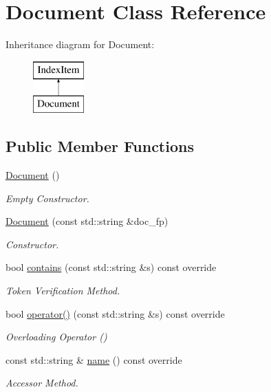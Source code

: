 \hypertarget{class_document}{}\section{Document Class Reference}
\label{class_document}
Inheritance diagram for Document\+:\begin{figure}[H]
\begin{center}
\leavevmode
\includegraphics[height=2.000000cm]{class_document}
\end{center}
\end{figure}
\subsection*{Public Member Functions}
\begin{DoxyCompactItemize}
\item 
\mbox{\label{class_document_acdbcbe550084e8c20f4f67eb229ad66a}} 
\hyperlink{class_document_acdbcbe550084e8c20f4f67eb229ad66a}{Document} ()
\begin{DoxyCompactList}\small\item\em Empty Constructor. \end{DoxyCompactList}\item 
\hyperlink{class_document_a4399bbc9420b5e5c269e9d38be5d4810}{Document} (const std\+::string \&doc\+\_\+fp)
\begin{DoxyCompactList}\small\item\em Constructor. \end{DoxyCompactList}\item 
bool \hyperlink{class_document_a68e12b27c40699cd3c2fff66a6161473}{contains} (const std\+::string \&s) const override
\begin{DoxyCompactList}\small\item\em Token Verification Method. \end{DoxyCompactList}\item 
bool \hyperlink{class_document_a44b8141f08f57f9122b3dba4a59bf7e4}{operator()} (const std\+::string \&s) const override
\begin{DoxyCompactList}\small\item\em Overloading Operator () \end{DoxyCompactList}\item 
const std\+::string \& \hyperlink{class_document_a68936706468433f1bbba813797e32bd5}{name} () const override
\begin{DoxyCompactList}\small\item\em Accessor Method. \end{DoxyCompactList}\end{DoxyCompactItemize}
